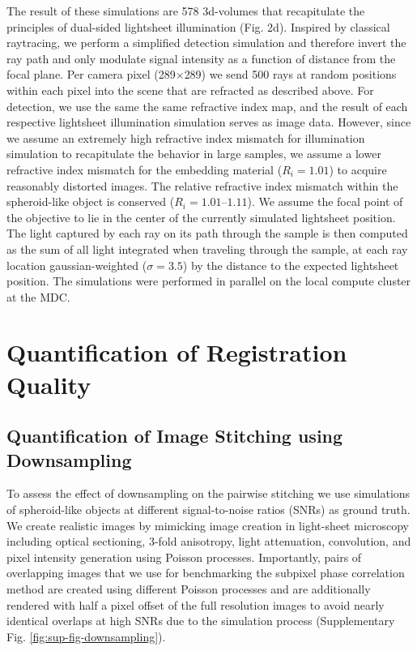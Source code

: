 The result of these simulations are 578 3d-volumes that recapitulate the principles of dual-sided lightsheet illumination (Fig. 2d). Inspired by classical raytracing, we perform a simplified detection simulation and therefore invert the ray path and only modulate signal intensity as a function of distance from the focal plane. Per camera pixel (289$\times$289) we send 500 rays at random positions within each pixel into the scene that are refracted as described above. For detection, we use the same the same refractive index map, and the result of each respective lightsheet illumination simulation serves as image data. However, since we assume an extremely high refractive index mismatch for illumination simulation to recapitulate the behavior in large samples, we assume a lower refractive index mismatch for the embedding material ($R_i=1.01$) to acquire reasonably distorted images. The relative refractive index mismatch within the spheroid-like object is conserved ($R_i=1.01 – 1.11$). We assume the focal point of the objective to lie in the center of the currently simulated lightsheet position. The light captured by each ray on its path through the sample is then computed as the sum of all light integrated when traveling through the sample, at each ray location  gaussian-weighted ($\sigma=3.5$) by the distance to the expected lightsheet position. The simulations were performed in parallel on the local compute cluster at the MDC.


\section{Quantification of Registration Quality}
\label{sec:quantreg}

\subsection*{Quantification of Image Stitching using Downsampling}

To assess the effect of downsampling on the pairwise stitching we use simulations of spheroid-like objects at different signal-to-noise ratios (SNRs) as ground truth. We create realistic images by mimicking image creation in light-sheet microscopy including optical sectioning, 3-fold anisotropy, light attenuation, convolution, and pixel intensity generation using Poisson processes\cite{mvdecon}. Importantly, pairs of overlapping images that we use for benchmarking the subpixel phase correlation method are created using different Poisson processes and are additionally rendered with half a pixel offset of the full resolution images to avoid nearly identical overlaps at high SNRs due to the simulation process (Supplementary Fig. \ref{fig:sup-fig-downsampling}).

